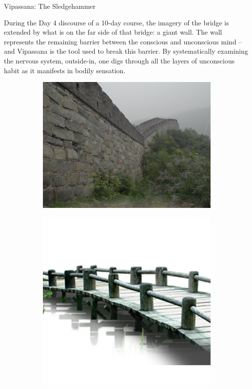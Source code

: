 \documentclass{article}
\begin{document}
\begin{center}
  \LARGE{Vipassana: The Sledgehammer}
\end{center}

During the Day 4 discourse of a 10-day course, the imagery of the bridge is extended by what is on the far side of that bridge: a giant wall. The wall represents the remaining barrier between the conscious and unconscious mind -- and Vipassana is the tool used to break this barrier. By systematically examining the nervous system, outside-in, one digs through all the layers of unconscious habit as it manifests in bodily sensation.

\begin{figure}[h!]
  \centering
  \begin{subfigure}[b]{0.48\linewidth}
    \includegraphics[width=\linewidth]{images/wall.jpg}
  \end{subfigure}
  \begin{subfigure}[b]{0.48\linewidth}
    \includegraphics[width=\linewidth]{images/bridge.png}
  \end{subfigure}
  \label{fig:wall}
\end{figure}
\end{document}
